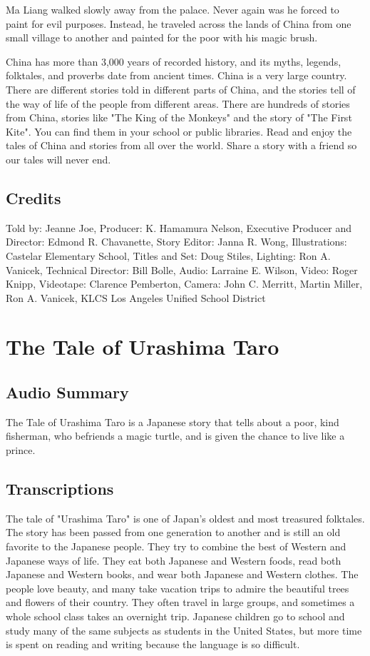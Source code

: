 Ma Liang walked slowly away from the palace. Never again was he forced to paint for evil purposes. Instead, he traveled across the lands of China from one small village to another and painted for the poor with his magic brush.

China has more than 3,000 years of recorded history, and its myths, legends, folktales, and proverbs date from ancient times. China is a very large country. There are different stories told in different parts of China, and the stories tell of the way of life of the people from different areas. There are hundreds of stories from China, stories like "The King of the Monkeys" and the story of "The First Kite". You can find them in your school or public libraries. Read and enjoy the tales of China and stories from all over the world. Share a story with a friend so our tales will never end.

\subsection{Credits}

Told by: Jeanne Joe,
Producer: K. Hamamura Nelson,
Executive Producer and Director: Edmond R. Chavanette,
Story Editor: Janna R. Wong,
Illustrations: Castelar Elementary School,
Titles and Set: Doug Stiles,
Lighting: Ron A. Vanicek,
Technical Director: Bill Bolle,
Audio: Larraine E. Wilson,
Video: Roger Knipp,
Videotape: Clarence Pemberton,
Camera: John C. Merritt, Martin Miller, Ron A. Vanicek,
KLCS Los Angeles Unified School District

\section{The Tale of Urashima Taro}

\subsection{Audio Summary}

The Tale of Urashima Taro is a Japanese story that tells about a poor, kind fisherman, who befriends a magic turtle, and is given the chance to live like a prince.

\subsection{Transcriptions}

The tale of "Urashima Taro" is one of Japan's oldest and most treasured folktales. The story has been passed from one generation to another and is still an old favorite to the Japanese people. They try to combine the best of Western and Japanese ways of life. They eat both Japanese and Western foods, read both Japanese and Western books, and wear both Japanese and Western clothes. The people love beauty, and many take vacation trips to admire the beautiful trees and flowers of their country. They often travel in large groups, and sometimes a whole school class takes an overnight trip. Japanese children go to school and study many of the same subjects as students in the United States, but more time is spent on reading and writing because the language is so difficult.

